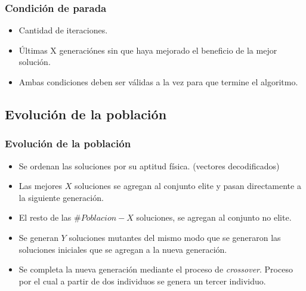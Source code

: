 \documentclass{beamer}
\begin{document}
\begin{frame}
\frametitle{Condición de parada}

\begin{itemize}
    \item Cantidad de iteraciones.
    \pause
    \item \'Ultimas X generaciónes sin que haya mejorado el beneficio de la mejor solución.
    \pause
    \item Ambas condiciones deben ser válidas a la vez para que termine el algoritmo.
\end{itemize}

\end{frame}


\subsection{Evolución de la población}

\begin{frame}
\frametitle{Evolución de la población}

\begin{itemize}
    \item Se ordenan las soluciones por su aptitud física. (vectores decodificados)
    \pause
    \item Las mejores $X$ soluciones se agregan al conjunto elite y pasan directamente a la siguiente generación.
    \pause
    \item El resto de las $\#Poblacion-X$ soluciones, se agregan al conjunto no elite.
    \pause
    \item Se generan $Y$ soluciones mutantes del mismo modo que se generaron las soluciones iniciales que se agregan a la nueva generación.
    \pause
    \item Se completa la nueva generación mediante el proceso de \textit{crossover}. Proceso por el cual a partir de dos individuos se genera un tercer individuo.
\end{itemize}

\end{frame}

\end{document}
